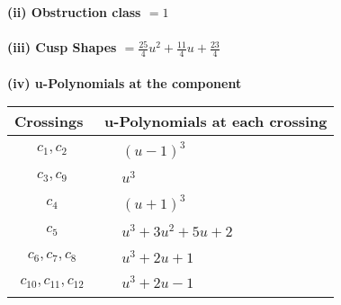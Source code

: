 \documentclass[1p]{elsarticle_modified}
\theoremstyle{definition}
\begin{document}
\flushleft \textbf{(ii) Obstruction class $= 1$}\\~\\
\flushleft \textbf{(iii) Cusp Shapes $= \frac{25}{4} u^2+\frac{11}{4} u+\frac{23}{4}$}\\~\\
\newpage\renewcommand{\arraystretch}{1}
\flushleft \textbf{(iv) u-Polynomials at the component}\newline \\
\begin{tabular}{m{50pt}|m{274pt}}
Crossings & \hspace{64pt}u-Polynomials at each crossing \\
\hline $$\begin{aligned}c_{1},c_{2}\end{aligned}$$&$\begin{aligned}
&(u-1)^3
\end{aligned}$\\
\hline $$\begin{aligned}c_{3},c_{9}\end{aligned}$$&$\begin{aligned}
&u^3
\end{aligned}$\\
\hline $$\begin{aligned}c_{4}\end{aligned}$$&$\begin{aligned}
&(u+1)^3
\end{aligned}$\\
\hline $$\begin{aligned}c_{5}\end{aligned}$$&$\begin{aligned}
&u^3+3 u^2+5 u+2
\end{aligned}$\\
\hline $$\begin{aligned}c_{6},c_{7},c_{8}\end{aligned}$$&$\begin{aligned}
&u^3+2 u+1
\end{aligned}$\\
\hline $$\begin{aligned}c_{10},c_{11},c_{12}\end{aligned}$$&$\begin{aligned}
&u^3+2 u-1
\end{aligned}$\\
\hline
\end{tabular}\\~\\
\end{document}
